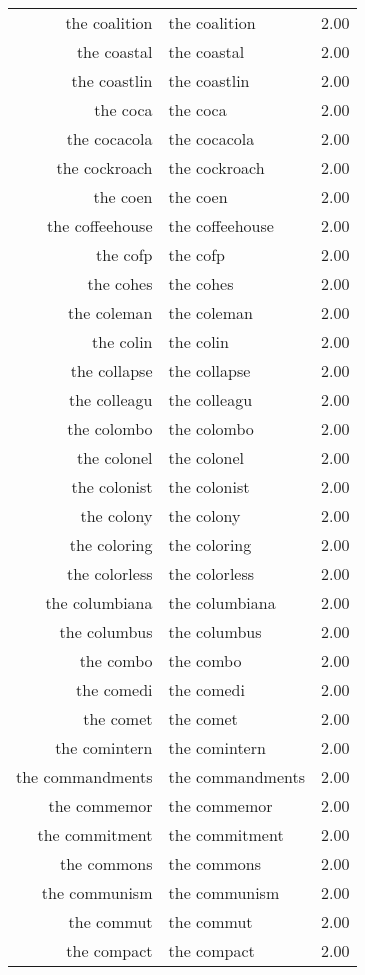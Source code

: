 \begin{table}[ht]
\begin{tabular}{rlr}
  the coalition & the coalition & 2.00 \\ 
  the coastal & the coastal & 2.00 \\ 
  the coastlin & the coastlin & 2.00 \\ 
  the coca & the coca & 2.00 \\ 
  the cocacola & the cocacola & 2.00 \\ 
  the cockroach & the cockroach & 2.00 \\ 
  the coen & the coen & 2.00 \\ 
  the coffeehouse & the coffeehouse & 2.00 \\ 
  the cofp & the cofp & 2.00 \\ 
  the cohes & the cohes & 2.00 \\ 
  the coleman & the coleman & 2.00 \\ 
  the colin & the colin & 2.00 \\ 
  the collapse & the collapse & 2.00 \\ 
  the colleagu & the colleagu & 2.00 \\ 
  the colombo & the colombo & 2.00 \\ 
  the colonel & the colonel & 2.00 \\ 
  the colonist & the colonist & 2.00 \\ 
  the colony & the colony & 2.00 \\ 
  the coloring & the coloring & 2.00 \\ 
  the colorless & the colorless & 2.00 \\ 
  the columbiana & the columbiana & 2.00 \\ 
  the columbus & the columbus & 2.00 \\ 
  the combo & the combo & 2.00 \\ 
  the comedi & the comedi & 2.00 \\ 
  the comet & the comet & 2.00 \\ 
  the comintern & the comintern & 2.00 \\ 
  the commandments & the commandments & 2.00 \\ 
  the commemor & the commemor & 2.00 \\ 
  the commitment & the commitment & 2.00 \\ 
  the commons & the commons & 2.00 \\ 
  the communism & the communism & 2.00 \\ 
  the commut & the commut & 2.00 \\ 
  the compact & the compact & 2.00 \\ 

\end{tabular}
\end{table}

